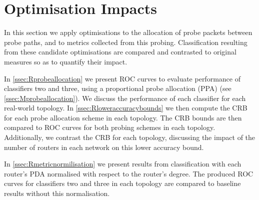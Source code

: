 \section{Optimisation Impacts}
\label{sec:Rprobingoptimality}
In this section we apply optimisations to the allocation of probe packets between probe paths, and to metrics collected from this probing. Classification resulting from these candidate optimisations are compared and contrasted to original measures so as to quantify their impact.\par
In \cref{ssec:Rprobeallocation} we present ROC curves to evaluate performance of classifiers two and three, using a proportional probe allocation (PPA) (see \cref{ssec:Mprobeallocation}). We discuss the performance of each classifier for each real-world topology. In \cref{ssec:Rloweraccuracybounds} we then compute the CRB for each probe allocation scheme in each topology. The CRB bounds are then compared to ROC curves for both probing schemes in each topology. Additionally, we contrast the CRB for each topology, discussing the impact of the number of routers in each network on this lower accuracy bound.\par
In \cref{ssec:Rmetricnormilisation} we present results from classification with each router's PDA normalised with respect to the router's degree. The produced ROC curves for classifiers two and three in each topology are compared to baseline results without this normalisation.


